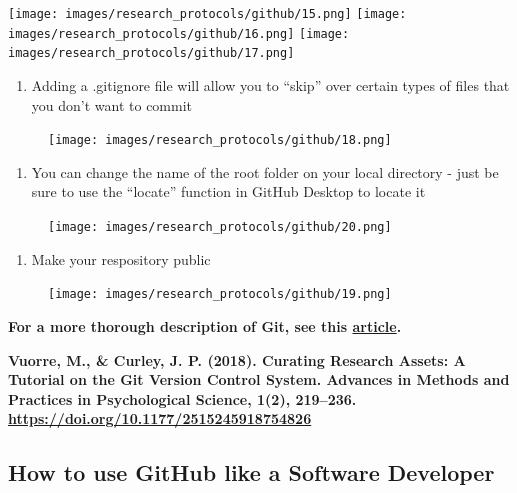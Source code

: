 \documentclass[
]{book}
\providecommand{\tightlist}{%
  \setlength{\itemsep}{0pt}\setlength{\parskip}{0pt}}
\begin{document}
\texttt{[image: images/research\_protocols/github/15.png]}
\texttt{[image: images/research\_protocols/github/16.png]}
\texttt{[image: images/research\_protocols/github/17.png]}

\begin{enumerate}
\def\labelenumi{\arabic{enumi}.}
\setcounter{enumi}{10}
\tightlist
\item
  Adding a .gitignore file will allow you to ``skip'' over certain types of files that you don't want to commit
\end{enumerate}

\begin{figure}
\centering
\texttt{[image: images/research\_protocols/github/18.png]}
\caption{}
\end{figure}

\begin{enumerate}
\def\labelenumi{\arabic{enumi}.}
\setcounter{enumi}{11}
\tightlist
\item
  You can change the name of the root folder on your local directory - just be sure to use the ``locate'' function in GitHub Desktop to locate it
\end{enumerate}

\begin{figure}
\centering
\texttt{[image: images/research\_protocols/github/20.png]}
\caption{}
\end{figure}

\begin{enumerate}
\def\labelenumi{\arabic{enumi}.}
\setcounter{enumi}{12}
\tightlist
\item
  Make your respository public
\end{enumerate}

\begin{figure}
\centering
\texttt{[image: images/research\_protocols/github/19.png]}
\caption{}
\end{figure}

\textbf{For a more thorough description of Git, see this \href{https://vuorre.netlify.app/publication/2018/06/01/curating-research-assets-a-tutorial-on-the-git-version-control-system/vuorre-curating-research-assets-2018.pdf}{article}.}

\textbf{Vuorre, M., \& Curley, J. P. (2018). Curating Research Assets: A Tutorial on the Git Version Control System. Advances in Methods and Practices in Psychological Science, 1(2), 219--236. \url{https://doi.org/10.1177/2515245918754826}}

\hypertarget{how-to-use-github-like-a-software-developer}{%
\subsection{How to use GitHub like a Software Developer}\label{how-to-use-github-like-a-software-developer}}
\end{document}

